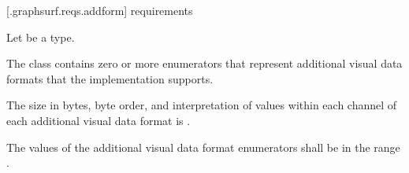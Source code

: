 
 [\iotwod.graphsurf.reqs.addform]{ requirements}

\pnum
Let  be a \graphicssurfacestemplparam type.

\pnum
The  class contains zero or more  enumerators that represent  additional visual data formats that the implementation supports.

\pnum
The size in bytes, byte order, and interpretation of values within each channel 
of each additional visual data format is \impdef.

\pnum
The values of the additional visual data format enumerators shall be in the 
range .
